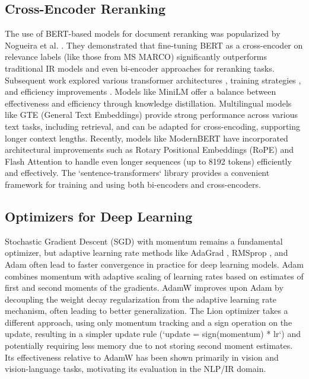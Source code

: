 \documentclass[conference]{IEEEtran}
\begin{document}
\subsection{Cross-Encoder Reranking}
The use of BERT-based models for document reranking was popularized by Nogueira et al. \cite{nogueira2020passagererankingbert, Nogueira2020Document}. They demonstrated that fine-tuning BERT as a cross-encoder on relevance labels (like those from MS MARCO) significantly outperforms traditional IR models and even bi-encoder approaches for reranking tasks. Subsequent work explored various transformer architectures \cite{Lin2021PretrainedTF}, training strategies \cite{gao2021complementing}, and efficiency improvements \cite{hofstatter2020improving}. Models like MiniLM \cite{wang2020minilm} offer a balance between effectiveness and efficiency through knowledge distillation. Multilingual models like GTE \cite{li2023towards} (General Text Embeddings) provide strong performance across various text tasks, including retrieval, and can be adapted for cross-encoding, supporting longer context lengths. Recently, models like ModernBERT \cite{modernbert} have incorporated architectural improvements such as Rotary Positional Embeddings (RoPE) \cite{su2023roformerenhancedtransformerrotary} and Flash Attention \cite{dao2022flashattentionfastmemoryefficientexact} to handle even longer sequences (up to 8192 tokens) efficiently and effectively. The `sentence-transformers` library \cite{reimers2019sentence} provides a convenient framework for training and using both bi-encoders and cross-encoders.

\subsection{Optimizers for Deep Learning}
Stochastic Gradient Descent (SGD) with momentum remains a fundamental optimizer, but adaptive learning rate methods like AdaGrad \cite{duchi2011adaptive}, RMSprop \cite{tieleman2012lecture}, and Adam \cite{kingma2017adam} often lead to faster convergence in practice for deep learning models. Adam combines momentum with adaptive scaling of learning rates based on estimates of first and second moments of the gradients. AdamW \cite{loshchilov2019decoupled} improves upon Adam by decoupling the weight decay regularization from the adaptive learning rate mechanism, often leading to better generalization. The Lion optimizer \cite{chen2023symbolic} takes a different approach, using only momentum tracking and a sign operation on the update, resulting in a simpler update rule (`update = sign(momentum) * lr`) and potentially requiring less memory due to not storing second moment estimates. Its effectiveness relative to AdamW has been shown primarily in vision and vision-language tasks, motivating its evaluation in the NLP/IR domain.
\end{document}
